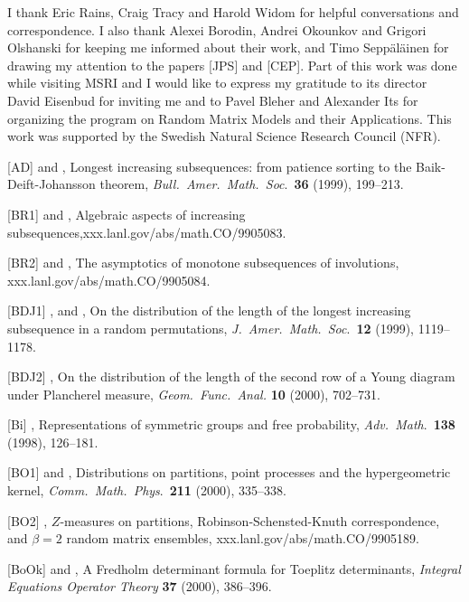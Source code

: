 I thank Eric Rains, Craig Tracy
and Harold Widom for helpful conversations and correspondence. I also
thank Alexei Borodin, Andrei Okounkov and Grigori Olshanski for keeping
me informed about their work, and Timo Sepp\"al\"ainen for drawing my
attention to the papers [JPS] and [CEP]. Part of this work was done
while visiting MSRI and I would like to express my gratitude to its 
director David Eisenbud for inviting me and to Pavel Bleher and 
Alexander Its for organizing the program on Random Matrix Models and their
Applications. This work was supported by the Swedish Natural Science
Research Council (NFR).


 
\AuthorRefNames [BDJ1]

[AD]  and ,  Longest increasing subsequences:
from patience sorting to the Baik-Deift-Johansson theorem,
{\it Bull.\ Amer.\ Math.\ Soc\/}.\ {\bf 36} (1999), 199--213.

[BR1]  and  ,  Algebraic aspects of increasing
subsequences,\hfill\break  xxx.lanl.gov/abs/math.CO/9905083.

[BR2]   and  ,  The asymptotics of monotone
subsequences of involutions, xxx.lanl.gov/abs/math.CO/9905084.

[BDJ1] , and ,  On the distribution
of the length of the longest 
increasing subsequence in a random permutations\rm, 
{\it J.\ Amer.\ Math.\ Soc\/}.\ {\bf 12} (1999), 1119--1178.

[BDJ2] \bibline,  On the distribution
of the length of the second row of a Young diagram under Plancherel
measure, {\it Geom.\ Func.\ Anal.\/} {\bf 10} (2000), 702--731.

[Bi] ,  Representations of symmetric groups and free
probability, {\it Adv.\ Math\/}.\ {\bf 138} (1998), 126--181.

[BO1]  and  ,  Distributions on partitions, point
processes and the hypergeometric kernel, {\it Comm.\ Math.\ Phys\/}.\
{\bf 211} (2000), 335--338.

[BO2] \bibline,  $Z$-measures on partitions, 
Robinson-Schensted-Knuth correspondence, and $\beta=2$ random matrix
ensembles, xxx.lanl.gov/abs/math.CO/9905189.

[BoOk]  and  ,  A Fredholm determinant formula
for Toeplitz determinants, {\it Integral Equations Operator Theory\/}
{\bf 37} (2000), 386--396.

